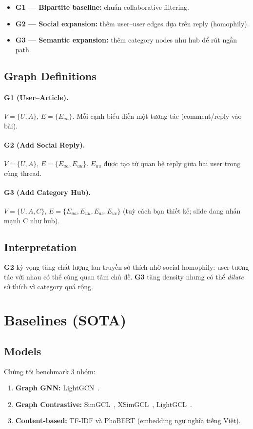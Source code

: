 \documentclass[11pt]{article}
\begin{document}
\begin{itemize}
  \item \textbf{G1 --- Bipartite baseline:} chuẩn collaborative filtering.
  \item \textbf{G2 --- Social expansion:} thêm user--user edges dựa trên reply (homophily).
  \item \textbf{G3 --- Semantic expansion:} thêm category nodes như hub để rút ngắn path.
\end{itemize}

\subsection{Graph Definitions}
\paragraph{G1 (User--Article).}
$V = \{U, A\}$, $E=\{E_{ua}\}$. Mỗi cạnh biểu diễn một tương tác (comment/reply vào bài).

\paragraph{G2 (Add Social Reply).}
$V = \{U, A\}$, $E=\{E_{ua}, E_{uu}\}$. $E_{uu}$ được tạo từ quan hệ reply giữa hai user trong cùng thread.

\paragraph{G3 (Add Category Hub).}
$V = \{U, A, C\}$, $E=\{E_{ua}, E_{uu}, E_{ac}, E_{uc}\}$ (tuỳ cách bạn thiết kế; slide đang nhấn mạnh C như hub).

\subsection{Interpretation}
\textbf{G2} kỳ vọng tăng chất lượng lan truyền sở thích nhờ social homophily: user tương tác với nhau có thể cùng quan tâm chủ đề. \textbf{G3} tăng density nhưng có thể \emph{dilute} sở thích vì category quá rộng.

\section{Baselines (SOTA)}
\label{sec:sota}

\subsection{Models}
Chúng tôi benchmark 3 nhóm:
\begin{enumerate}
  \item \textbf{Graph GNN:} LightGCN~\cite{he2020lightgcn}.
  \item \textbf{Graph Contrastive:} SimGCL~\cite{yu2022graph}, XSimGCL~\cite{yu2023xsimgcl}, LightGCL~\cite{cai2023lightgcl}.
  \item \textbf{Content-based:} TF-IDF và PhoBERT (embedding ngữ nghĩa tiếng Việt).
\end{enumerate}
\end{document}
